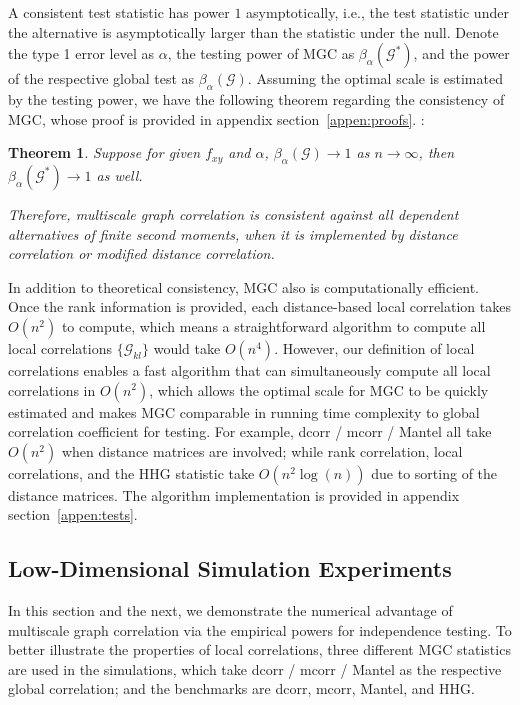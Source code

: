 \documentclass[11pt]{article}
\newcommand{\G}{\mathcal{G}}
\newtheorem{thm}{Theorem}
\begin{document}
A consistent test statistic has power $1$ asymptotically, i.e., the test statistic under the alternative is asymptotically larger than the statistic under the null. Denote the type 1 error level as $\alpha$, the testing power of MGC as $\beta_{\alpha}(\G^{*})$, and the power of the respective global test as $\beta_{\alpha}(\G)$. Assuming the optimal scale is estimated by the testing power, we have the following theorem regarding the consistency of MGC, whose proof is provided in appendix section~\ref{appen:proofs}. :
\begin{thm}
\label{thm1}
Suppose for given $f_{xy}$ and $\alpha$, $\beta_{\alpha}(\G) \rightarrow 1$ as $n \rightarrow \infty$, then $\beta_{\alpha}(\G^{*}) \rightarrow 1$ as well.

Therefore, multiscale graph correlation is consistent against all dependent alternatives of finite second moments, when it is implemented by distance correlation or modified distance correlation.
\end{thm}


In addition to theoretical consistency, MGC also is computationally efficient. Once the rank information is provided, each distance-based local correlation takes $O(n^2)$ to compute, which means a straightforward algorithm to compute all local correlations $\{\G_{kl}\}$ would take $O(n^4)$. However, our definition of local correlations enables a fast algorithm that can simultaneously compute all local correlations in $O(n^2)$, which allows the optimal scale for MGC to be quickly estimated and makes MGC comparable in running time complexity to global correlation coefficient for testing. For example, dcorr / mcorr / Mantel all take $O(n^2)$ when distance matrices are involved; while rank correlation, local correlations, and the HHG statistic take $O(n^2\log(n))$ due to sorting of the distance matrices. The algorithm implementation is provided in appendix section~\ref{appen:tests}.

\subsection{Low-Dimensional Simulation Experiments}
\label{numer1}
In this section and the next, we demonstrate the numerical advantage of multiscale graph correlation via the empirical powers for independence testing. To better illustrate the properties of local correlations, three different MGC statistics are used in the simulations, which take dcorr / mcorr / Mantel as the respective global correlation; and the benchmarks are dcorr, mcorr, Mantel, and HHG. %
\end{document}
